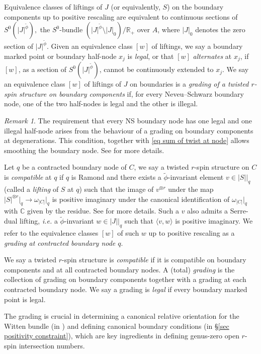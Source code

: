 \documentclass[11pt]{amsart}
\theoremstyle{definition}
\theoremstyle{remark}
\newtheorem{rmk}[dummy]{Remark}
\newcommand{\<}{\left<}
\renewcommand{\>}{\right>}
\numberwithin{equation}{section}
\begin{document}
 Equivalence classes of liftings of $J$ (or equivalently, $S$) on the boundary components up to positive rescaling are equivalent to continuous sections of $S^0(|J|^{\widetilde\phi}),$ the $S^0$-bundle $\left(|J|^{\widetilde{\phi}}\setminus |J|_0\right)\big/ \mathbb R_+$ over $A$, where $|J|_0$ denotes the zero section of $|J|^{\widetilde{\phi}}$. Given an equivalence class $[w]$  of liftings, we say a boundary marked point or boundary half-node $x_j$ is \textit{legal}, or that $[w]$ \textit{alternates} at $x_j$, if $[w]$, as a section of $S^0(|J|^{\widetilde\phi})$, cannot be continuously extended to $x_j$.
We say an equivalence class $[w]$ of liftings of $J$ on boundaries is a \textit{grading of a twisted $r$-spin structure on boundary components} if, for every Neveu--Schwarz boundary node, one of the two half-nodes is legal and the other is illegal. 
\begin{rmk}
    The requirement that every NS boundary node has one legal and one illegal half-node arises from the behaviour of a grading on boundary components at degenerations. This condition, together with \eqref{eq sum of twist at node} allows smoothing the boundary node. See \cite{BCT1} for more details.
\end{rmk}

Let $q$ be a contracted boundary node of $C$, we say a twisted $r$-spin structure on $C$ is \textit{compatible} at $q$ if $q$ is Ramond and there exists a $\widetilde{\phi}$-invariant element $v \in |S|\big|_q$  (called a \textit{lifting} of $S$ at $q$) such that the image of $v^{\otimes r}$ under the map $|S|^{\otimes r}\big|_q \to \omega_{|C|}\big|_q$ is positive imaginary under the canonical identification of $\omega_{|C|}\big|_q$ with ${\mathbb{C}}$ given by the residue. See \cite[Definition 2.8]{BCT1} for more details.  Such a $v$ also admits a Serre-dual lifting, \textit{i.e.}  a $\widetilde{\phi}$-invariant $w \in |J|\big\vert_q$ such that $\langle v, w \rangle$ is positive imaginary.  We refer to the equivalence classes $[w]$ of such $w$ up to positive rescaling as a \textit{grading at contracted boundary node $q$}.

We say a twisted $r$-spin structure is \textit{compatible} if it is compatible on boundary components and at all contracted boundary nodes.  A (total) \textit{grading} is the collection of grading on boundary components together with a grading at each contracted boundary node. We say a grading is \textit{legal} if every boundary marked point is legal.


The grading is crucial in determining a canonical relative orientation for the Witten bundle (in \cite{TZ1}) and defining canonical boundary conditions (in \S \ref{sec positivity constraint}), which are key ingredients in defining genus-zero open $r$-spin intersection numbers.
\end{document}
